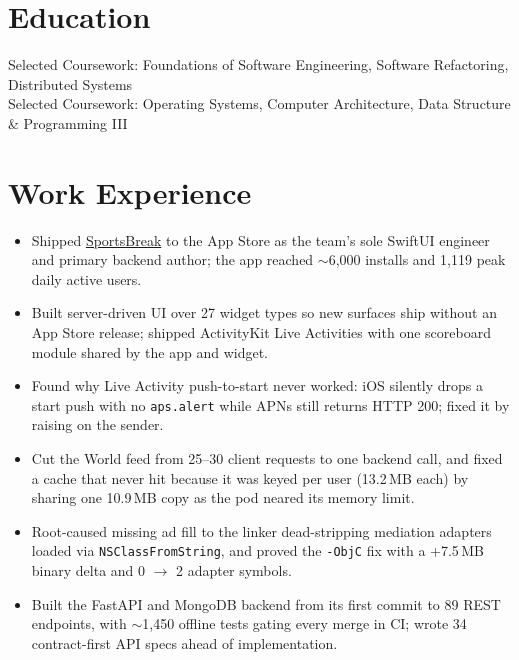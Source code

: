 \documentclass[11pt, letterpaper]{article}
\begin{document}

\section{Education}
Selected Coursework: Foundations of Software Engineering, Software Refactoring, Distributed Systems\\[1pt]
Selected Coursework: Operating Systems, Computer Architecture, Data Structure \& Programming III

\section{Work Experience}
\begin{itemize}
  \item Shipped \href{https://apps.apple.com/app/id6762649287}{SportsBreak} to the App Store as the team's sole SwiftUI engineer and primary backend author; the app reached $\sim$6{,}000 installs and 1{,}119 peak daily active users.
  \item Built server-driven UI over 27 widget types so new surfaces ship without an App Store release; shipped ActivityKit Live Activities with one scoreboard module shared by the app and widget.
  \item Found why Live Activity push-to-start never worked: iOS silently drops a start push with no \texttt{aps.alert} while APNs still returns HTTP 200; fixed it by raising on the sender.
  \item Cut the World feed from 25--30 client requests to one backend call, and fixed a cache that never hit because it was keyed per user (13.2\,MB each) by sharing one 10.9\,MB copy as the pod neared its memory limit.
  \item Root-caused missing ad fill to the linker dead-stripping mediation adapters loaded via \texttt{NSClassFromString}, and proved the \texttt{-ObjC} fix with a +7.5\,MB binary delta and 0 $\to$ 2 adapter symbols.
  \item Built the FastAPI and MongoDB backend from its first commit to 89 REST endpoints, with $\sim$1{,}450 offline tests gating every merge in CI; wrote 34 contract-first API specs ahead of implementation.
\end{itemize}
\end{document}
